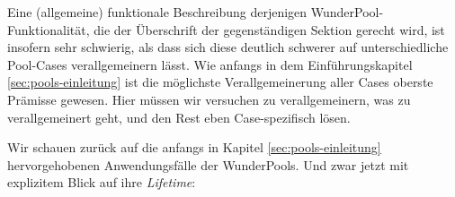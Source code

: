 
Eine (allgemeine) funktionale Beschreibung derjenigen WunderPool-Funktionalität, die der Überschrift der gegenständigen Sektion gerecht wird, ist insofern sehr schwierig, als dass sich diese deutlich schwerer auf unterschiedliche Pool-Cases verallgemeinern lässt. Wie anfangs in dem Einführungskapitel \ref{sec:pools-einleitung} ist die möglichste Verallgemeinerung aller Cases oberste Prämisse gewesen. Hier müssen wir versuchen zu verallgemeinern, was zu verallgemeinert geht, und den Rest eben Case-spezifisch lösen. 

\vspace{0.3cm}

Wir schauen zurück auf die anfangs in Kapitel \ref{sec:pools-einleitung} hervorgehobenen Anwendungsfälle der WunderPools. Und zwar jetzt mit explizitem Blick auf ihre \textit{Lifetime}:

